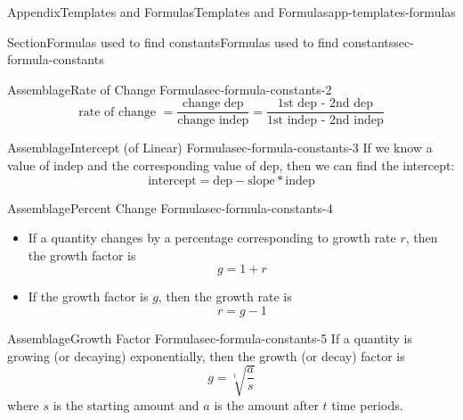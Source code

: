 \documentclass[twoside,11pt,]{book}
\numberwithin{equation}{section}
\begin{document}
\begin{appendixptx}{Appendix}{Templates and Formulas}{}{Templates and Formulas}{}{}{app-templates-formulas}
%
\begin{sectionptx}{Section}{Formulas used to find constants}{}{Formulas used to find constants}{}{}{sec-formula-constants}
\begin{assemblage}{Assemblage}{Rate of Change Formula}{sec-formula-constants-2}%
%
\begin{equation*}
\text{rate of change } = \frac{\text{change dep}}{\text{change indep}} = \frac{\text{1st dep - 2nd dep}}{\text{1st indep - 2nd indep}}
\end{equation*}
%
\end{assemblage}
\begin{assemblage}{Assemblage}{Intercept (of Linear) Formula}{sec-formula-constants-3}%
If we know a value of indep and the corresponding value of dep, then we can find the intercept:%
\begin{equation*}
\text{intercept} = \text{dep} - \text{slope}\ast\text{indep}
\end{equation*}
%
\end{assemblage}
\begin{assemblage}{Assemblage}{Percent Change Formula}{sec-formula-constants-4}%
%
\begin{itemize}[label=\textbullet]
\item{}If a quantity changes by a percentage corresponding to growth rate \(r\), then the growth factor is%
\begin{equation*}
\displaystyle g=1+r
\end{equation*}
%
\item{}If the growth factor is \(g\), then the growth rate is%
\begin{equation*}
r = g-1
\end{equation*}
%
\end{itemize}
%
\end{assemblage}
\begin{assemblage}{Assemblage}{Growth Factor Formula}{sec-formula-constants-5}%
If a quantity is growing (or decaying) exponentially, then the growth (or decay) factor is%
\begin{equation*}
\displaystyle g = \sqrt[t]{\frac{a}{s}}
\end{equation*}
where \(s\) is the starting amount and \(a\) is the amount after \(t\) time periods.%
\end{assemblage}
\end{sectionptx}
%
%
\typeout{************************************************}
\typeout{************************************************}

\end{appendixptx}
\end{document}
